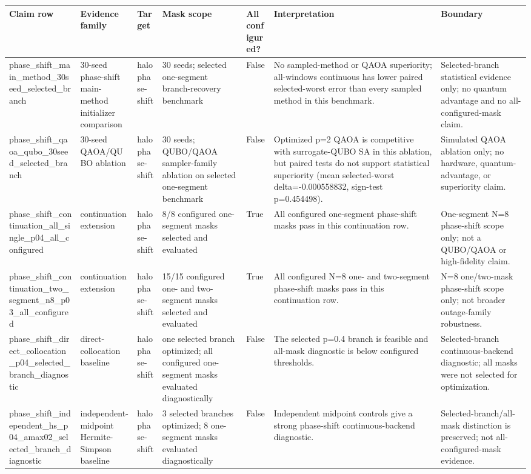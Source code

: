 \begin{tabular}{lllllll}
\toprule
Claim row & Evidence family & Target & Mask scope & All configured? & Interpretation & Boundary \\
\midrule
phase\_shift\_main\_method\_30seed\_selected\_branch & 30-seed phase-shift main-method initializer comparison & halo phase-shift & 30 seeds; selected one-segment branch-recovery benchmark & False & No sampled-method or QAOA superiority; all-windows continuous has lower paired selected-worst error than every sampled method in this benchmark. & Selected-branch statistical evidence only; no quantum advantage and no all-configured-mask claim. \\
phase\_shift\_qaoa\_qubo\_30seed\_selected\_branch & 30-seed QAOA/QUBO ablation & halo phase-shift & 30 seeds; QUBO/QAOA sampler-family ablation on selected one-segment benchmark & False & Optimized p=2 QAOA is competitive with surrogate-QUBO SA in this ablation, but paired tests do not support statistical superiority (mean selected-worst delta=-0.000558832, sign-test p=0.454498). & Simulated QAOA ablation only; no hardware, quantum-advantage, or superiority claim. \\
phase\_shift\_continuation\_all\_single\_p04\_all\_configured & continuation extension & halo phase-shift & 8/8 configured one-segment masks selected and evaluated & True & All configured one-segment phase-shift masks pass in this continuation row. & One-segment N=8 phase-shift scope only; not a QUBO/QAOA or high-fidelity claim. \\
phase\_shift\_continuation\_two\_segment\_n8\_p03\_all\_configured & continuation extension & halo phase-shift & 15/15 configured one- and two-segment masks selected and evaluated & True & All configured N=8 one- and two-segment phase-shift masks pass in this continuation row. & N=8 one/two-mask phase-shift scope only; not broader outage-family robustness. \\
phase\_shift\_direct\_collocation\_p04\_selected\_branch\_diagnostic & direct-collocation baseline & halo phase-shift & one selected branch optimized; all configured one-segment masks evaluated diagnostically & False & The selected p=0.4 branch is feasible and all-mask diagnostic is below configured thresholds. & Selected-branch continuous-backend diagnostic; all masks were not selected for optimization. \\
phase\_shift\_independent\_hs\_p04\_amax02\_selected\_branch\_diagnostic & independent-midpoint Hermite-Simpson baseline & halo phase-shift & 3 selected branches optimized; 8 one-segment masks evaluated diagnostically & False & Independent midpoint controls give a strong phase-shift continuous-backend diagnostic. & Selected-branch/all-mask distinction is preserved; not all-configured-mask evidence. \\

\end{tabular}
